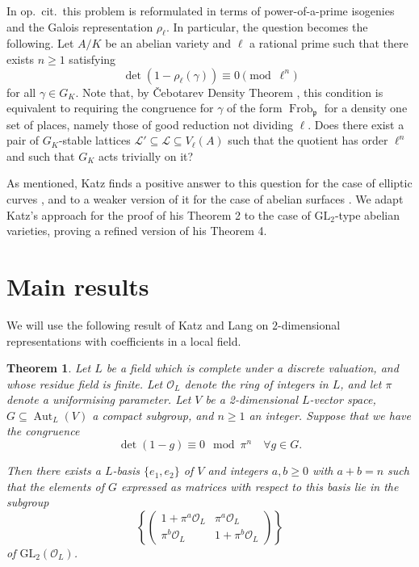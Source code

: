 \documentclass[a4paper,11pt]{amsart}
\newtheorem{theorem}{Theorem}[section]
\theoremstyle{definition}
\newcommand{\p}{\mathfrak{p}}
\newcommand{\GL}{\text{GL}}
\DeclareMathOperator{\Aut}{Aut}
\DeclareMathOperator{\Frob}{Frob}
\newcommand{\mat}[4]{\left(\begin{array}{cc}
#1 &#2\\
#3 &#4
\end{array}\right)}
\begin{document}
In op.\ cit.\ this problem is reformulated in terms of power-of-a-prime isogenies and the Galois representation \(\rho_\ell\). In particular, the question becomes the following.
Let \(A/K\) be an abelian variety and \(\ell\) a rational prime such that there exists \(n \ge 1\) satisfying
\[
\det(1-\rho_\ell(\gamma)) \equiv 0 \pmod {\ell^n }
\]
for all \(\gamma \in G_K\). Note that, by \v{C}ebotarev Density Theorem \cite[Theorem 13.4]{Neukirch1999AlgebraicTheory}, this condition is equivalent to requiring the congruence for \(\gamma\) of the form \(\Frob_\p\) for a density one set of places, namely those of good reduction not dividing \(\ell\).
Does there exist a pair of \(G_K\)-stable lattices \(\mathcal{L'} \subseteq \mathcal{L} \subseteq V_\ell(A)\) such that the quotient has order \(\ell^n\) and such that \(G_K\) acts trivially on it?

As mentioned, Katz finds a positive answer to this question for the case of elliptic curves \cite[Theorem 2, 2 bis]{Katz1981GaloisVarieties}, and to a weaker version of it for the case of abelian surfaces \cite[Theorem 4]{Katz1981GaloisVarieties}. We adapt Katz's approach for the proof of his Theorem 2 to the case of \(\GL_2\)-type abelian varieties, proving a refined version of his Theorem 4.

\section{Main results}\label{sec:main}

We will use the following result of Katz and Lang \cite[Theorem 1 (bis)]{Katz1981GaloisVarieties} on \(2\)-dimensional representations with coefficients in a local field.

\begin{theorem}\label{thm:Katz}
    Let \(L\) be a field which is complete under a discrete valuation, and whose residue field is finite. Let \(\mathcal{O}_L\) denote the ring of integers in \(L\), and let \(\pi\) denote a uniformising parameter. Let \(V\) be a 2-dimensional \(L\)-vector space, \(G \subseteq \Aut_L(V)\) a compact subgroup, and \(n \ge 1\) an integer. Suppose that we have the congruence
    \[
    \det(1-g) \equiv 0 \mod \pi^n \quad \forall g \in G.
    \]

    Then there exists a \(L\)-basis \(\{e_1,e_2\}\) of \(V\) and integers \(a,b \ge 0\) with \(a+b=n\) such that the elements of \(G\) expressed as matrices with respect to this basis lie in the subgroup
    \[
    \left\lbrace \mat{1 + \pi^a \mathcal{O}_L}{\pi^a \mathcal{O}_L}{\pi^b \mathcal{O}_L}{1 + \pi^b \mathcal{O}_L} \right\rbrace
    \]
    of \(\GL_2(\mathcal{O}_L)\).
\end{theorem}
\end{document}
